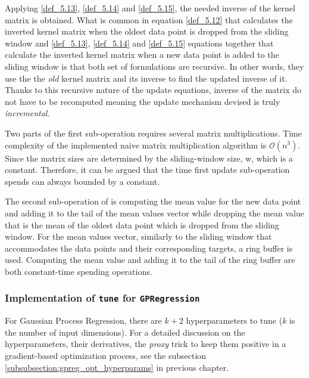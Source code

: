 Applying \ref{def_5.13}, \ref{def_5.14} and \ref{def_5.15}, the needed inverse of the kernel matrix is obtained. What is common in equation \ref{def_5.12} that calculates the inverted kernel matrix when the oldest data point is dropped from the sliding window and \ref{def_5.13}, \ref{def_5.14} and \ref{def_5.15} equations together that calculate the inverted kernel matrix when a new data point is added to the sliding window is that both set of formulations are recursive. In other words, they use the the \textit{old} kernel matrix and its inverse to find the updated inverse of it. Thanks to this recursive nature of the update equations, inverse of the matrix do not have to be recomputed meaning the update mechanism devised is truly \textit{incremental}.

Two parts of the first sub-operation requires several matrix multiplications. Time complexity of the implemented naive matrix multiplication algorithm is $\mathcal{O}(n^3)$. Since the matrix sizes are determined by the sliding-window size, w, which is a constant. Therefore, it can be argued that the time first update sub-operation spends can always bounded by a constant.

The second sub-operation of  is computing the mean value for the new data point and adding it to the tail of the mean values vector while dropping the mean value that is the mean of the oldest data point which is dropped from the sliding window. For the mean values vector, similarly to the sliding window that accommodates the data points and their corresponding targets, a ring buffer is used. Computing the mean value and adding it to the tail of the ring buffer are both constant-time spending operations. 

\subsubsection{Implementation of \texttt{tune} for \texttt{GPRegression}}
\label{subsubsection:impl_tune_gpreg}

For Gaussian Process Regression, there are $k+2$ hyperparameters to tune ($k$ is the number of input dimensions). For a detailed discussion on the hyperparameters, their derivatives, the \textit{proxy} trick to keep them positive in a gradient-based optimization process, see the subsection \ref{subsubsection:gpreg_opt_hyperparams} in previous chapter.

